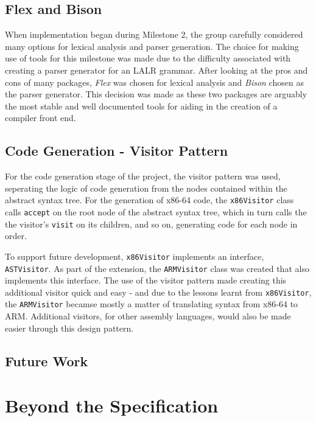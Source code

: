\documentclass[a4wide, 11pt]{article}
\begin{document}
\newpage

\subsection{Flex and Bison}

When implementation began during Milestone 2, the group carefully considered
many options for lexical analysis and parser generation. The choice for making 
use of tools for this milestone was made due to the difficulty associated with
creating a parser generator for an LALR grammar. After looking at the
pros and cons of many packages, \emph{Flex} was chosen for lexical analysis
and \emph{Bison} chosen as the parser generator. This decision was made as 
these two packages are arguably the most stable and well documented tools for 
aiding in the creation of a compiler front end.

\subsection{Code Generation - Visitor Pattern}

For the code generation stage of the project, the visitor pattern was used, 
seperating the logic of code generation from the nodes contained within the
abstract syntax tree. For the generation of x86-64 code, the \texttt{x86Visitor}
class calls \texttt{accept} on the root node of the abstract syntax tree, which
in turn calls the the visitor's \texttt{visit} on its children, and so on, 
generating code for each node in order. 

To support future development, \texttt{x86Visitor} implements an interface,
\texttt{ASTVisitor}. As part of the extension, the \texttt{ARMVisitor} class was
created that also implements this interface. The use of the visitor pattern
made creating this additional visitor quick and easy - and due to the lessons
learnt from \texttt{x86Visitor}, the \texttt{ARMVisitor} becamse mostly a
matter of translating syntax from x86-64 to ARM. Additional visitors, for other
assembly languages, would also be made easier through this design pattern.

\subsection{Future Work}



\section{Beyond the Specification}

\enddocument
\end{document}
